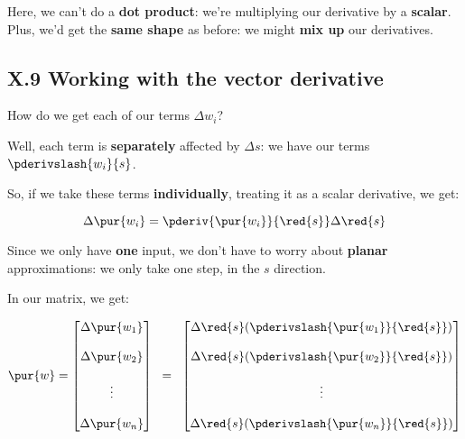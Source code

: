         Here, we can't do a \textbf{dot product}: we're multiplying our derivative by a \textbf{scalar}. Plus, we'd get the \textbf{same shape} as before: we might \textbf{mix up} our derivatives.
    
    \secdiv
    
    \subsection*{X.9 \quad Working with the vector derivative}   
        
        How do we get each of our terms $\Delta w_i$?
        
        Well, each term is \textbf{separately} affected by $\Delta s$: we have our terms $\pderivslash{w_i}{s}$.
        
        So, if we take these terms \textbf{individually}, treating it as a scalar derivative, we get:
            
        \begin{equation}
            \Delta \pur{w_i} = \pderiv{\pur{w_i}}{\red{s}} \Delta \red{s}
        \end{equation}
        
        Since we only have \textbf{one} input, we don't have to worry about \textbf{planar} approximations: we only take one step, in the $s$ direction.
        
        In our matrix, we get:
        
        \begin{equation}
            \pur{w}
            =
            \begin{bmatrix}
                \Delta \pur{w_1}\\\\ \Delta \pur{w_2}\\\\ \vdots \\\\ \Delta \pur{w_n}
            \end{bmatrix}
            \;\;
            =
            \;\;
            \begin{bmatrix}
                \Delta \red{s} ( \pderivslash{ \pur{w_1} }{ \red{s} } )\\\\
                \Delta \red{s} ( \pderivslash{ \pur{w_2} }{ \red{s} } )\\\\
                \vdots \\\\
                \Delta \red{s} ( \pderivslash{ \pur{w_n} }{ \red{s} } )
            \end{bmatrix}
        \end{equation}
        
